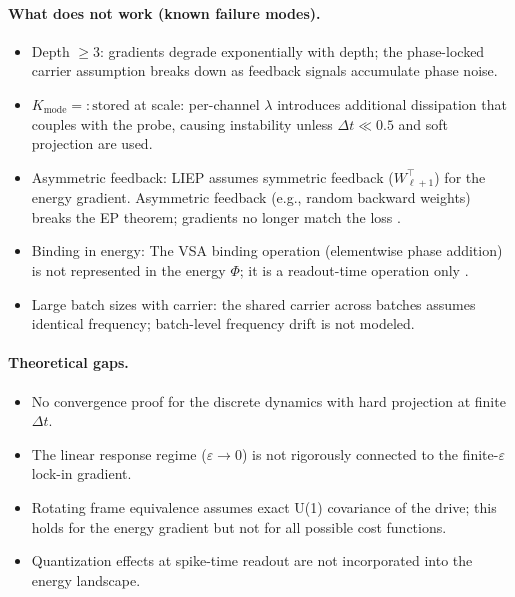 \documentclass[11pt]{article}
\newcommand{\dt}{\Delta t}
\begin{document}
\paragraph{What does not work (known failure modes).}
\begin{itemize}
\item Depth $\ge 3$: gradients degrade exponentially with depth; the phase-locked carrier assumption breaks down as feedback signals accumulate phase noise.
\item $K_{\text{mode}}=:\text{stored}$ at scale: per-channel $\lambda$ introduces additional dissipation that couples with the probe, causing instability unless $\dt \ll 0.5$ and soft projection are used.
\item Asymmetric feedback: LIEP assumes symmetric feedback ($W_{\ell+1}^\top$) for the energy gradient. Asymmetric feedback (e.g., random backward weights) breaks the EP theorem; gradients no longer match the loss \citep{scellier2017equilibrium}.
\item Binding in energy: The VSA binding operation (elementwise phase addition) is not represented in the energy $\Phi$; it is a readout-time operation only \citep{olin2023hyperdimensional}.
\item Large batch sizes with carrier: the shared carrier across batches assumes identical frequency; batch-level frequency drift is not modeled.
\end{itemize}

\paragraph{Theoretical gaps.}
\begin{itemize}
\item No convergence proof for the discrete dynamics with hard projection at finite $\dt$.
\item The linear response regime ($\varepsilon \to 0$) is not rigorously connected to the finite-$\varepsilon$ lock-in gradient.
\item Rotating frame equivalence assumes exact U(1) covariance of the drive; this holds for the energy gradient but not for all possible cost functions.
\item Quantization effects at spike-time readout are not incorporated into the energy landscape.
\end{itemize}
\end{document}
